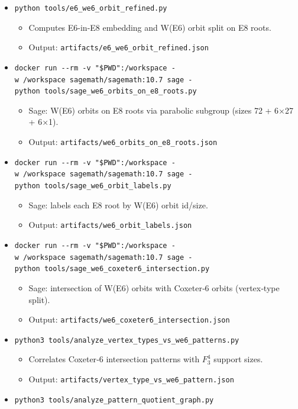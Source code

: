 \documentclass[11pt]{article}
\providecommand{\tightlist}{%
  \setlength{\itemsep}{0pt}\setlength{\parskip}{0pt}}
\begin{document}
\begin{itemize}
\tightlist
\item
  \texttt{python\ tools/e6\_we6\_orbit\_refined.py}

  \begin{itemize}
  \tightlist
  \item
    Computes E6-in-E8 embedding and W(E6) orbit split on E8 roots.
  \item
    Output: \texttt{artifacts/e6\_we6\_orbit\_refined.json}
  \end{itemize}
\item
  \texttt{docker\ run\ -\/-rm\ -v\ "\$PWD":/workspace\ -w\ /workspace\ sagemath/sagemath:10.7\ sage\ -python\ tools/sage\_we6\_orbits\_on\_e8\_roots.py}

  \begin{itemize}
  \tightlist
  \item
    Sage: W(E6) orbits on E8 roots via parabolic subgroup (sizes 72 +
    6\ensuremath{\times}27 + 6\ensuremath{\times}1).
  \item
    Output: \texttt{artifacts/we6\_orbits\_on\_e8\_roots.json}
  \end{itemize}
\item
  \texttt{docker\ run\ -\/-rm\ -v\ "\$PWD":/workspace\ -w\ /workspace\ sagemath/sagemath:10.7\ sage\ -python\ tools/sage\_we6\_orbit\_labels.py}

  \begin{itemize}
  \tightlist
  \item
    Sage: labels each E8 root by W(E6) orbit id/size.
  \item
    Output: \texttt{artifacts/we6\_orbit\_labels.json}
  \end{itemize}
\item
  \texttt{docker\ run\ -\/-rm\ -v\ "\$PWD":/workspace\ -w\ /workspace\ sagemath/sagemath:10.7\ sage\ -python\ tools/sage\_we6\_coxeter6\_intersection.py}

  \begin{itemize}
  \tightlist
  \item
    Sage: intersection of W(E6) orbits with Coxeter‑6 orbits
    (vertex‑type split).
  \item
    Output: \texttt{artifacts/we6\_coxeter6\_intersection.json}
  \end{itemize}
\item
  \texttt{python3\ tools/analyze\_vertex\_types\_vs\_we6\_patterns.py}

  \begin{itemize}
  \tightlist
  \item
    Correlates Coxeter‑6 intersection patterns with \(F_{3}^{4}\)
    support sizes.
  \item
    Output: \texttt{artifacts/vertex\_type\_vs\_we6\_pattern.json}
  \end{itemize}
\item
  \texttt{python3\ tools/analyze\_pattern\_quotient\_graph.py}


\end{itemize}
\end{document}
